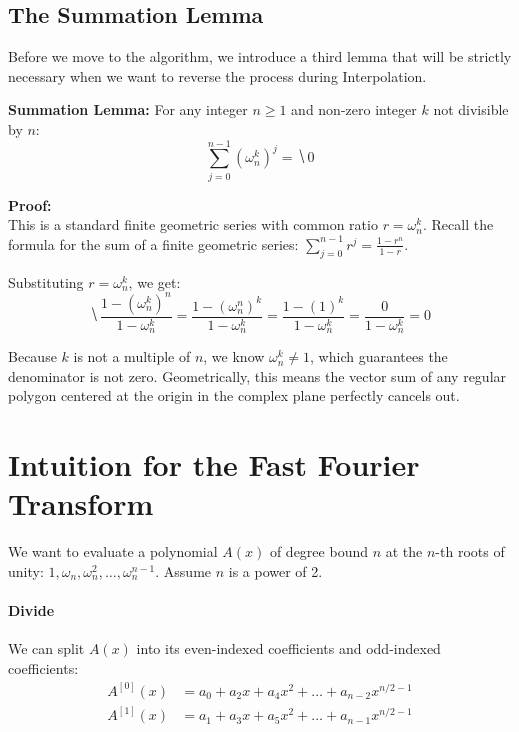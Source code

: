 \documentclass[11  pt]{article}
\begin{document}
\newpage

\subsection{The Summation Lemma}

Before we move to the algorithm, we introduce a third lemma that will be strictly necessary when we want to reverse the process during Interpolation.

\begin{lemma}\textbf{Summation Lemma:} For any integer $n \geq 1$ and non-zero integer $k$ not divisible by $n$:
    \begin{equation*}
        \sum_{j=0}^{n-1} (\omega_n^k)^j = \hide{0}
    \end{equation*}
\end{lemma}

\vs{0.5cm}
\textbf{Proof:} \\
This is a standard finite geometric series with common ratio $r = \omega_n^k$. 
Recall the formula for the sum of a finite geometric series: $\sum_{j=0}^{n-1} r^j = \frac{1 - r^n}{1 - r}$. 

Substituting $r = \omega_n^k$, we get:
\begin{equation*}
    \hide{\frac{1 - (\omega_n^k)^n}{1 - \omega_n^k} = \frac{1 - (\omega_n^n)^k}{1 - \omega_n^k} = \frac{1 - (1)^k}{1 - \omega_n^k} = \frac{0}{1 - \omega_n^k} = 0}
\end{equation*}

Because $k$ is not a multiple of $n$, we know $\omega_n^k \neq 1$, which guarantees the denominator is not zero. Geometrically, this means the vector sum of any regular polygon centered at the origin in the complex plane perfectly cancels out.

\vs{1.5cm}

\section{Intuition for the Fast Fourier Transform}

We want to evaluate a polynomial $A(x)$ of degree bound $n$ at the $n$-th roots of unity: $1, \omega_n, \omega_n^2, \hdots, \omega_n^{n-1}$. Assume $n$ is a power of 2.

\paragraph{Divide}
We can split $A(x)$ into its even-indexed coefficients and odd-indexed coefficients:
\begin{align*}
    A^{[0]}(x) &= a_0 + a_2 x + a_4 x^2 + \hdots + a_{n-2} x^{n/2 - 1} \\
    A^{[1]}(x) &= a_1 + a_3 x + a_5 x^2 + \hdots + a_{n-1} x^{n/2 - 1}
\end{align*}
\end{document}
